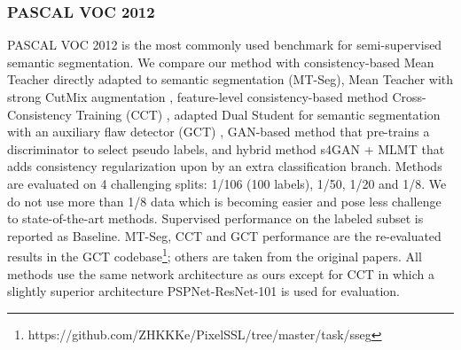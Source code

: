 \documentclass[preprint,review,10pt]{elsarticle}
\begin{document}
\subsubsection{PASCAL VOC 2012}
\label{sec:532}

PASCAL VOC 2012 is the most commonly used benchmark for semi-supervised semantic segmentation. We compare our method with consistency-based Mean Teacher directly adapted to semantic segmentation (MT-Seg), Mean Teacher with strong CutMix augmentation \cite{french2019semisupervised}, feature-level consistency-based method Cross-Consistency Training (CCT) \cite{ouali2020semi}, adapted Dual Student for semantic segmentation with an auxiliary flaw detector (GCT) \cite{ke2020gct}, GAN-based method \cite{hung} that pre-trains a discriminator to select pseudo labels, and hybrid method s4GAN + MLMT \cite{mittal2019semi} that adds consistency regularization upon \cite{hung} by an extra classification branch. Methods are evaluated on 4 challenging splits: 1/106 (100 labels), 1/50, 1/20 and 1/8. We do not use more than 1/8 data which is becoming easier and pose less challenge to state-of-the-art methods. Supervised performance on the labeled subset is reported as Baseline. MT-Seg, CCT and GCT performance are the re-evaluated results in the GCT codebase\footnote{https://github.com/ZHKKKe/PixelSSL/tree/master/task/sseg}; others are taken from the original papers. All methods use the same network architecture as ours except for CCT in which a slightly superior architecture PSPNet-ResNet-101 \cite{zhao2017pyramid} is used for evaluation.
\end{document}
